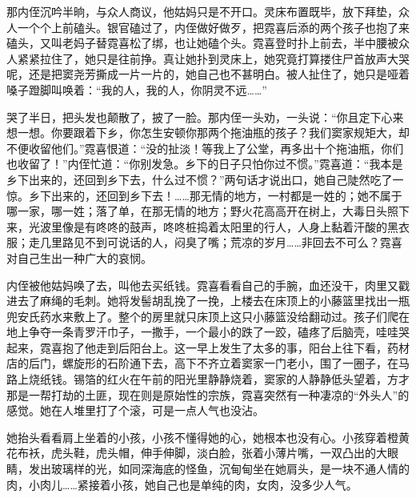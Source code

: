 \par 那内侄沉吟半晌，与众人商议，他姑妈只是不开口。灵床布置既毕，放下拜垫，众人一个个上前磕头。银官磕过了，内侄做好做歹，把霓喜后添的两个孩子也抱了来磕头，又叫老妈子替霓喜松了绑，也让她磕个头。霓喜登时扑上前去，半中腰被众人紧紧拉住了，她只是往前挣。真让她扑到灵床上，她究竟打算搂住尸首放声大哭呢，还是把窦尧芳撕成一片一片的，她自己也不甚明白。被人扯住了，她只是哑着嗓子蹬脚叫唤着：“我的人，我的人，你阴灵不远……”
\par 哭了半日，把头发也颠散了，披了一脸。那内侄一头劝，一头说：“你且定下心来想一想。你要跟着下乡，你怎生安顿你那两个拖油瓶的孩子？我们窦家规矩大，却不便收留他们。”霓喜恨道：“没的扯淡！等我上了公堂，再多出十个拖油瓶，你们也收留了！”内侄忙道：“你别发急。乡下的日子只怕你过不惯。”霓喜道：“我本是乡下出来的，还回到乡下去，什么过不惯？”两句话才说出口，她自己陡然吃了一惊。乡下出来的，还回到乡下去！……那无情的地方，一村都是一姓的；她不属于哪一家，哪一姓；落了单，在那无情的地方；野火花高高开在树上，大毒日头照下来，光波里像是有咚咚的鼓声，咚咚桩捣着太阳里的行人，人身上黏着汗酸的黑衣服；走几里路见不到可说话的人，闷臭了嘴；荒凉的岁月……非回去不可么？霓喜对自己生出一种广大的哀悯。
\par 内侄被他姑妈唤了去，叫他去买纸钱。霓喜看看自己的手腕，血还没干，肉里又戳进去了麻绳的毛刺。她将发髻胡乱挽了一挽，上楼去在床顶上的小藤篮里找出一瓶兜安氏药水来敷上了。整个的房里就只床顶上这只小藤篮没给翻动过。孩子们爬在地上争夺一条青罗汗巾子，一撒手，一个最小的跌了一跤，磕疼了后脑壳，哇哇哭起来，霓喜抱了他走到后阳台上。这一早上发生了太多的事，阳台上往下看，药材店的后门，螺旋形的石阶通下去，高下不齐立着窦家一门老小，围了一圈子，在马路上烧纸钱。锡箔的红火在午前的阳光里静静烧着，窦家的人静静低头望着，方才那是一帮打劫的土匪，现在则是原始性的宗族，霓喜突然有一种凄凉的“外头人”的感觉。她在人堆里打了个滚，可是一点人气也没沾。
\par 她抬头看看肩上坐着的小孩，小孩不懂得她的心，她根本也没有心。小孩穿着橙黄花布袄，虎头鞋，虎头帽，伸手伸脚，淡白脸，张着小薄片嘴，一双凸出的大眼睛，发出玻璃样的光，如同深海底的怪鱼，沉甸甸坐在她肩头，是一块不通人情的肉，小肉儿……紧接着小孩，她自己也是单纯的肉，女肉，没多少人气。
